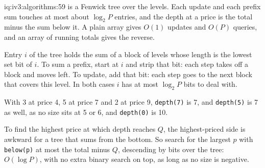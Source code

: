 \begin{solution}{iq:iv3:algorithms:59}
 is a Fenwick tree over the levels. Each update and each prefix sum touches at most about $\log_2 P$ entries, and the depth at a price is the total minus the sum below it. A plain array gives $O(1)$ updates and $O(P)$ queries, and an array of running totals gives the reverse.
\label{lst:iv3:al:fenwick}

Entry $i$ of the tree holds the sum of a block of levels whose length is the lowest set bit of $i$. To sum a prefix, start at $i$ and strip that bit: each step takes off a block and moves left. To update, add that bit: each step goes to the next block that covers this level. In both cases $i$ has at most $\log_2 P$ bits to deal with.

With 3 at price 4, 5 at price 7 and 2 at price 9, \texttt{depth(7)} is 7, and \texttt{depth(5)} is 7 as well, as no size sits at 5 or 6, and \texttt{depth(0)} is 10.

To find the highest price at which depth reaches $Q$, the highest-priced side is awkward for a tree that sums from the bottom. So search for the largest $p$ with \texttt{below(p)} at most the total minus $Q$, descending by bits over the tree: $O(\log P)$, with no extra binary search on top, as long as no size is negative.

\end{solution}

